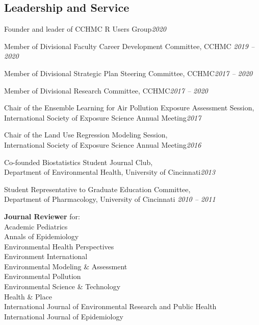 \documentclass[margin,line]{res}
\newenvironment{list3}{
  \begin{list}{}{%
      \setlength{\itemsep}{0in}
      \setlength{\parsep}{0in} \setlength{\parskip}{0in}
      \setlength{\topsep}{0in} \setlength{\partopsep}{0in}
      \setlength{\leftmargin}{0in}}}{\end{list}}
\begin{document}
\begin{resume}
\section{\sc Leadership and Service}
\begin{list3} \itemsep 4pt
  \item[] Founder and leader of CCHMC R Users Group\hfill \textit{2020}
\item[] Member of Divisional Faculty Career Development Committee, CCHMC\hfill
  \textit{2019 -- 2020}
\item[] Member of Divisional Strategic Plan Steering Committee, CCHMC\hfill \textit{2017 -- 2020}
\item[] Member of Divisional Research Committee, CCHMC\hfill \textit{2017 -- 2020}
\item[] Chair of the Ensemble Learning for Air Pollution Exposure Assessment Session, \\International Society of Exposure Science Annual Meeting\hfill \textit{2017}
\item[] Chair of the Land Use Regression Modeling Session, \\International Society of Exposure Science Annual Meeting\hfill \textit{2016}
\item[] Co-founded Biostatistics Student Journal Club, \\Department of Environmental Health, University of Cincinnati\hfill \textit{2013}
\item[] Student Representative to Graduate Education Committee, \\Department of Pharmacology, University of Cincinnati \hfill \textit{2010 -- 2011}
\item[] \textbf{Journal Reviewer} for: \\
        Academic Pediatrics \\
        Annals of Epidemiology \\
        Environmental Health Perspectives \\
        Environment International \\
        Environmental Modeling \& Assessment \\
        Environmental Pollution \\
        Environmental Science \& Technology \\
        Health \& Place \\
        International Journal of Environmental Research and Public Health \\
        International Journal of Epidemiology \\

\end{list3}
\end{resume}
\end{document}
